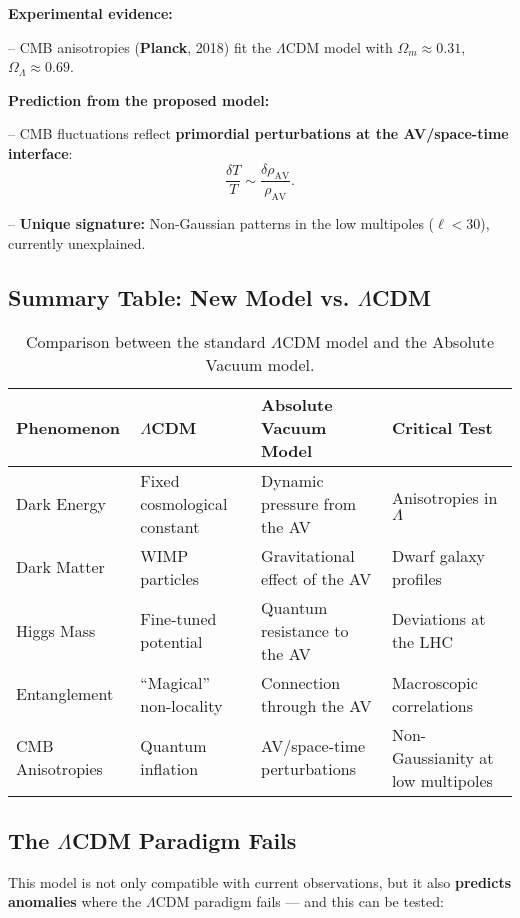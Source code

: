 \documentclass[a4paper]{article}
\theoremstyle{definition}
\theoremstyle{remark}
\numberwithin{equation}{section}
\begin{document}
\textbf{Experimental evidence:}

– CMB anisotropies (\textbf{Planck}, 2018) fit the \( \Lambda \)CDM model with \( \Omega_m \approx 0.31 \), \( \Omega_\Lambda \approx 0.69 \).

\textbf{Prediction from the proposed model:}

– CMB fluctuations reflect \textbf{primordial perturbations at the AV/space-time interface}:
\[
\frac{\delta T}{T} \sim \frac{\delta \rho_{\text{AV}}}{\rho_{\text{AV}}}.
\]

– \textbf{Unique signature:} Non-Gaussian patterns in the low multipoles (\( \ell < 30 \)), currently unexplained.

\subsection{Summary Table: New Model vs. \(\Lambda\)CDM}

\begin{table}[H]
	\centering
	\renewcommand{\arraystretch}{1.3}
	\begin{tabularx}{\textwidth}{|X|X|X|X|}
		\hline
		\textbf{Phenomenon} & \textbf{\(\Lambda\)CDM} & \textbf{Absolute Vacuum Model} & \textbf{Critical Test} \\
		\hline
		Dark Energy & Fixed cosmological constant & Dynamic pressure from the AV & Anisotropies in \( \Lambda \) \\
		\hline
		Dark Matter & WIMP particles & Gravitational effect of the AV & Dwarf galaxy profiles \\
		\hline
		Higgs Mass & Fine-tuned potential & Quantum resistance to the AV & Deviations at the LHC \\
		\hline
		Entanglement & ``Magical'' non-locality & Connection through the AV & Macroscopic correlations \\
		\hline
		CMB Anisotropies & Quantum inflation \cite{Bezrukov} & AV/space-time perturbations & Non-Gaussianity at low multipoles \\
		\hline
	\end{tabularx}
	\caption{Comparison between the standard \(\Lambda\)CDM model and the Absolute Vacuum model.}
\end{table}

\subsection{The \(\Lambda\)CDM Paradigm Fails}

This model is not only compatible with current observations, but it also \textbf{predicts anomalies} where the \(\Lambda\)CDM paradigm fails — and this can be tested:
\end{document}
